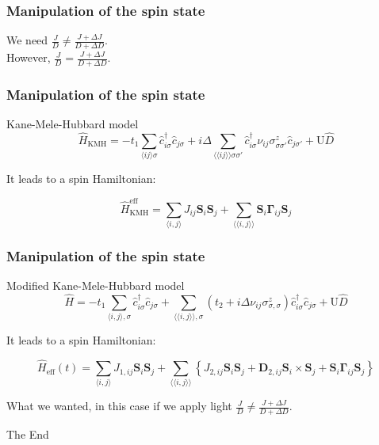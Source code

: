 \documentclass{beamer}
\newcommand{\bs}[1] {\boldsymbol{#1}}
\begin{document}
\begin{frame}
\frametitle{Manipulation of the spin state}
We need $\frac{J}{D} \neq \frac{J+\Delta J}{D+\Delta D}$.
\\[10mm]
However, $\frac{J}{D} = \frac{J+\Delta J}{D+\Delta D}$.
\end{frame}

\begin{frame}
\frametitle{Manipulation of the spin state}
\begin{block}{Kane-Mele-Hubbard model}
\begin{equation}
\hat{H}_{\text{KMH}} = -t_1\sum_{\langle i j \rangle \sigma} \hat{c}^{\dagger}_{i\sigma}\hat{c}_{j\sigma} + i\Delta \sum_{\langle \langle i j \rangle \rangle \sigma \sigma'} \hat{c}^{\dagger}_{i\sigma} \nu_{ij} \sigma^z_{\sigma \sigma'} \hat{c}_{j\sigma'} + \text{U}\hat{D}\nonumber
\end{equation}

It leads to a spin Hamiltonian:

\begin{equation}
\hat{H}_{\text{KMH}}^{\text{eff}} = \sum_{\langle i,j \rangle} J_{ij} \bs{S}_i \bs{S}_j + \sum_{\langle \langle i,j \rangle \rangle} \bs{S}_i \bs{\Gamma}_{ij} \bs{S}_j \nonumber
\end{equation}

\end{block}
\end{frame}

\begin{frame}
\frametitle{Manipulation of the spin state}
\begin{block}{Modified Kane-Mele-Hubbard model}
\begin{equation}
\hat{H} = - t_1\sum_{\langle i,j \rangle, \sigma} \hat{c}_{i \sigma}^\dagger \hat{c}_{j \sigma} + 
	\sum_{\langle \langle i,j \rangle \rangle, \sigma}(t_2 + i\Delta\nu_{ij}\sigma^z_{\sigma, \sigma})\hat{c}_{i \sigma}^\dagger \hat{c}_{j \sigma} + 
	\text{U}\hat{D}\nonumber
\end{equation}

It leads to a spin Hamiltonian:

\begin{equation}
\hat{H}_{\text{eff}}(t) = \sum_{\langle i,j \rangle} J_{1,ij}\bs{S}_i\bs{S}_j + \sum_{\langle \langle i,j \rangle \rangle} \left\{ J_{2,ij}\bs{S}_i\bs{S}_j + \bs{D}_{2,ij} \bs{S}_i \times \bs{S}_j + \bs{S}_i \bs{\Gamma}_{ij} \bs{S}_j \right\} \nonumber
\end{equation}

What we wanted, in this case if we apply light $\frac{J}{D} \neq \frac{J+\Delta J}{D + \Delta D}$.

\end{block}
\end{frame}

\begin{frame}
\Huge{\centerline{The End}}
\end{frame}
\end{document}
